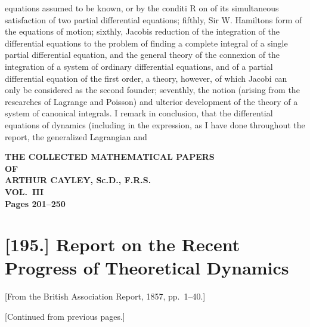 \documentclass[11pt,a4paper]{book}
\begin{document}
equations assumed to be known, or by the conditi R on of its simultaneous satisfaction of
two partial differential equations; fifthly, Sir W. Hamiltons form of the equations
of motion; sixthly, Jacobis reduction of the integration of the differential equations
to the problem of finding a complete integral of a single partial differential equation,
and the general theory of the connexion of the integration of a system of ordinary
differential equations, and of a partial differential equation of the first order, a theory,
however, of which Jacobi can only be considered as the second founder; seventhly, the
notion (arising from the researches of Lagrange and Poisson) and ulterior development
of the theory of a system of canonical integrals.
I remark in conclusion, that the differential equations of dynamics (including in
the expression, as I have done throughout the report, the generalized Lagrangian and
\clearpage


\begin{center}
  \LARGE\bfseries THE COLLECTED MATHEMATICAL PAPERS\\[0.5em]
  \large OF\\[0.5em]
  \LARGE ARTHUR CAYLEY, Sc.D., F.R.S.\\[1em]
  \large VOL.~III\\[0.5em]
  \normalsize Pages 201--250
\end{center}

\vspace{1em}



\newpage

\newpage

\section*{[195.] Report on the Recent Progress of Theoretical Dynamics}
\begin{center}
[From the British Association Report, 1857, pp.~1--40.]
\end{center}

{\small [Continued from previous pages.]}

\end{document}
